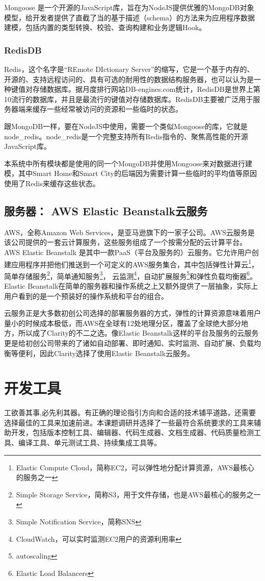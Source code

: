 Mongoose 是一个开源的JavaScript库，旨在为NodeJS提供优雅的MongoDB对象模型，给开发者提供了直截了当的基于描述（schema）的方法来为应用程序数据建模，包括内置的类型转换、校验、查询构建和业务逻辑Hook。
\subsubsection{RedisDB}
Redis，这个名字是“REmote DIctionary Server”的缩写，它是一个基于内存的、开源的、支持远程访问的、具有可选的耐用性的数据结构服务器，也可以认为是一种键值对存储数据库。据月度排行网站DB-engines.com统计，RedisDB是世界上第10流行的数据库，并且是最流行的键值对存储数据库。RedisDB主要被广泛用于服务器端来缓存一些经常被访问的资源和一些临时的状态。

跟MongoDB一样，要在NodeJS中使用，需要一个类似Mongoose的库，它就是node_redis。node_redis是一个完整支持所有Redis指令的、聚焦高性能的开源JavaScript库。

本系统中所有模块都是使用的同一个MongoDB并使用Mongoose来对数据进行建模，其中Smart Home和Smart City的后端因为需要计算一些临时的平均值等原因使用了Redis来缓存这些状态。

\subsection{服务器： AWS Elastic Beanstalk云服务}
AWS，全称Amazon Web Services，是亚马逊旗下的一家子公司。AWS云服务是该公司提供的一套云计算服务，这些服务组成了一个按需分配的云计算平台。AWS Elastic Beanstalk 是其中一款PaaS（平台及服务的）云服务。它允许用户创建应用程序并把他们推送到一个可定义的AWS服务集合，其中包括弹性计算云\footnote{Elastic Compute Cloud，简称EC2，可以弹性地分配计算资源，AWS最核心的服务之一}，简单存储服务\footnote{Simple Storage Service，简称S3，用于文件存储，也是AWS最核心的服务之一}，简单通知服务\footnote{Simple Notification Service，简称SNS}， 云监测\footnote{CloudWatch，可以实时监测EC2用户的资源利用率}，自动扩展服务\footnote{autoscaling}和弹性负载均衡器\footnote{Elastic Load Balancers}。Elastic Beanstalk在简单的服务器和操作系统之上又额外提供了一层抽象，实际上用户看到的是一个预装好的操作系统和平台的组合。

云服务正是大多数初创公司选择的部署服务器的方式，弹性的计算资源意味着用户量小的时候成本极低，而AWS在全球有12处地理分区，覆盖了全球绝大部分地方，所以成了Clarity的不二之选。像Elastic Beanstalk这样的平台及服务的云服务更是给初创公司带来的了诸如自动部署、即时通知、实时监测、自动扩展、负载均衡等便利，因此Clarity选择了使用Elastic Beanstalk云服务。

\section{开发工具}
工欲善其事,必先利其器。有正确的理论指引方向和合适的技术铺平道路，还需要选择最佳的工具来加速前进。本课题调研并选择了一些最符合系统要求的工具来辅助开发，包括版本控制工具、编辑器、代码生成器、文档生成器、代码质量检测工具、编译工具、单元测试工具、持续集成工具等。
